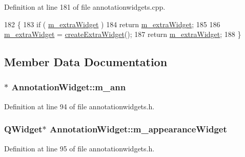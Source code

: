 Definition at line 181 of file annotationwidgets.\+cpp.


\begin{DoxyCode}
182 \{
183     \textcolor{keywordflow}{if} ( \hyperlink{classAnnotationWidget_abd0a469cc5f14e5e73243f405b5d3649}{m\_extraWidget} )
184         \textcolor{keywordflow}{return} \hyperlink{classAnnotationWidget_abd0a469cc5f14e5e73243f405b5d3649}{m\_extraWidget};
185 
186     \hyperlink{classAnnotationWidget_abd0a469cc5f14e5e73243f405b5d3649}{m\_extraWidget} = \hyperlink{classAnnotationWidget_ab46dbe69c6723a640048a75f6bf47423}{createExtraWidget}();
187     \textcolor{keywordflow}{return} \hyperlink{classAnnotationWidget_abd0a469cc5f14e5e73243f405b5d3649}{m\_extraWidget};
188 \}
\end{DoxyCode}


\subsection{Member Data Documentation}
\hypertarget{classAnnotationWidget_a6b7e6688554d24cfea509b139b3ecedc}{
\subsubsection[{m\+\_\+ann}]{$\ast$ Annotation\+Widget\+::m\+\_\+ann\hspace{0.3cm}{\ttfamily [protected]}}}\label{classAnnotationWidget_a6b7e6688554d24cfea509b139b3ecedc}


Definition at line 94 of file annotationwidgets.\+h.

\hypertarget{classAnnotationWidget_a5ab466a198ca0a99fd2e0fd0ace527b2}{
\subsubsection[{m\+\_\+appearance\+Widget}]{\setlength{\rightskip}{0pt plus 5cm}Q\+Widget$\ast$ Annotation\+Widget\+::m\+\_\+appearance\+Widget\hspace{0.3cm}{\ttfamily [protected]}}}\label{classAnnotationWidget_a5ab466a198ca0a99fd2e0fd0ace527b2}


Definition at line 95 of file annotationwidgets.\+h.

